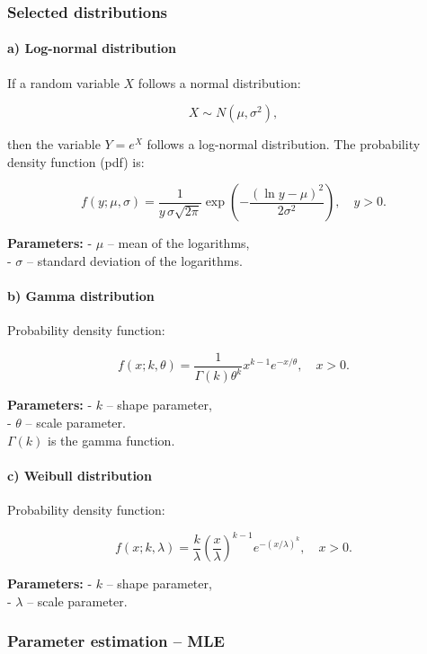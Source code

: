 \documentclass[
]{article}
\begin{document}
\subsubsection{Selected distributions}\label{selected-distributions}

\paragraph{a) Log-normal distribution}\label{a-log-normal-distribution}

If a random variable \(X\) follows a normal distribution:

\[
X \sim N(\mu, \sigma^2),
\]

then the variable \(Y = e^X\) follows a log-normal distribution. The
probability density function (pdf) is:

\[
f(y; \mu, \sigma) = \frac{1}{y \, \sigma \sqrt{2\pi}} \exp\left(-\frac{(\ln y - \mu)^2}{2\sigma^2}\right), \quad y > 0.
\]

\textbf{Parameters:} - \(\mu\) -- mean of the logarithms,\\
- \(\sigma\) -- standard deviation of the logarithms.

\paragraph{b) Gamma distribution}\label{b-gamma-distribution}

Probability density function:

\[
f(x; k, \theta) = \frac{1}{\Gamma(k)\theta^k} x^{k-1} e^{-x/\theta}, \quad x > 0.
\]

\textbf{Parameters:} - \(k\) -- shape parameter,\\
- \(\theta\) -- scale parameter.\\
\(\Gamma(k)\) is the gamma function.

\paragraph{c) Weibull distribution}\label{c-weibull-distribution}

Probability density function:

\[
f(x; k, \lambda) = \frac{k}{\lambda} \left(\frac{x}{\lambda}\right)^{k-1} e^{-(x/\lambda)^k}, \quad x > 0.
\]

\textbf{Parameters:} - \(k\) -- shape parameter,\\
- \(\lambda\) -- scale parameter.

\subsubsection{Parameter estimation --
MLE}\label{parameter-estimation-mle}
\end{document}
